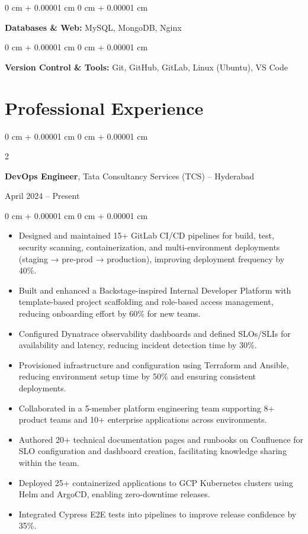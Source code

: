 \documentclass[10pt, letterpaper]{article}
\newenvironment{highlights}{
    \begin{itemize}[
        topsep=0.10 cm,
        parsep=0.10 cm,
        partopsep=0pt,
        itemsep=0pt,
        leftmargin=0 cm + 10pt
    ]
}{
    \end{itemize}
} %
\newenvironment{onecolentry}{
    \begin{adjustwidth}{
        0 cm + 0.00001 cm
    }{
        0 cm + 0.00001 cm
    }
}{
    \end{adjustwidth}
} %
\newenvironment{twocolentry}[2][]{
    \onecolentry
    \def\secondColumn{#2}
    \setcolumnwidth{\fill, 4.5 cm}
    \begin{paracol}{2}
}{
    \switchcolumn \raggedleft \secondColumn
    \end{paracol}
    \endonecolentry
} %
\begin{document}
    \begin{onecolentry}
    \textbf{Databases \& Web:} MySQL, MongoDB, Nginx
    \end{onecolentry}
    
    \vspace{0.2 cm}
    
    \begin{onecolentry}
    \textbf{Version Control \& Tools:} Git, GitHub, GitLab, Linux (Ubuntu), VS Code
    \end{onecolentry}

    \section{Professional Experience}
    \begin{twocolentry}{April 2024 – Present}
        \textbf{DevOps Engineer}, Tata Consultancy Services (TCS) -- Hyderabad
    \end{twocolentry}
    \vspace{0.10 cm}
    \begin{onecolentry}
        \begin{highlights}
            \item Designed and maintained 15+ GitLab CI/CD pipelines for build, test, security scanning, containerization, and multi-environment deployments (staging → pre-prod → production), improving deployment frequency by 40\%.
            \item Built and enhanced a Backstage-inspired Internal Developer Platform with template-based project scaffolding and role-based access management, reducing onboarding effort by 60\% for new teams.
            \item Configured Dynatrace observability dashboards and defined SLOs/SLIs for availability and latency, reducing incident detection time by 30\%.
            \item Provisioned infrastructure and configuration using Terraform and Ansible, reducing environment setup time by 50\% and ensuring consistent deployments.
            \item Collaborated in a 5-member platform engineering team supporting 8+ product teams and 10+ enterprise applications across environments.
            \item Authored 20+ technical documentation pages and runbooks on Confluence for SLO configuration and dashboard creation, facilitating knowledge sharing within the team.
            \item Deployed 25+ containerized applications to GCP Kubernetes clusters using Helm and ArgoCD, enabling zero-downtime releases.
            \item Integrated Cypress E2E tests into pipelines to improve release confidence by 35\%.
        \end{highlights}
    \end{onecolentry}
\end{document}
